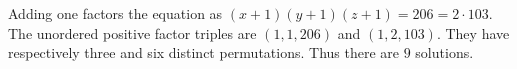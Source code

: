 Adding one factors the equation as $(x+1)(y+1)(z+1)=206=2\cdot103$. The unordered positive factor triples are $(1,1,206)$ and $(1,2,103)$. They have respectively three and six distinct permutations. Thus there are $\boxed9$ solutions.
